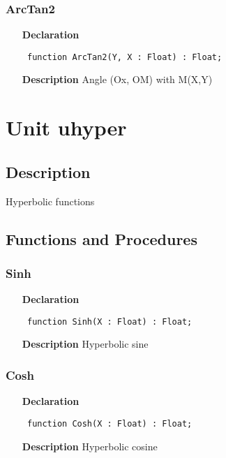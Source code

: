 \documentclass[12pt,a4paper,oneside]{report}
\newcommand{\declarationitem}[1]{\textbf{#1}}
\newcommand{\descriptiontitle}[1]{\textbf{#1}}
\newcommand{\code}[1]{\texttt{#1}}
\begin{document}
\subsubsection{ArcTan2}
\label{utrigo-ArcTan2}
\begin{itemize}\item[\declarationitem{Declaration}\hfill]
	\begin{flushleft}
		\code{
			function ArcTan2(Y, X : Float) : Float;}
		
	\end{flushleft}
	
	\par
	\item[\descriptiontitle{Description}]
	Angle (Ox, OM) with M(X,Y)
	
\end{itemize}

\section{Unit uhyper}
\label{uhyper}
\subsection{Description}
Hyperbolic functions 
\subsection{Functions and Procedures}
\subsubsection{Sinh}
\label{uhyper-Sinh}
\begin{itemize}\item[\declarationitem{Declaration}\hfill]
	\begin{flushleft}
		\code{
			function Sinh(X : Float) : Float;}
		
	\end{flushleft}
	
	\par
	\item[\descriptiontitle{Description}]
	Hyperbolic sine
	
\end{itemize}
\subsubsection{Cosh}
\label{uhyper-Cosh}
\begin{itemize}\item[\declarationitem{Declaration}\hfill]
	\begin{flushleft}
		\code{
			function Cosh(X : Float) : Float;}
		
	\end{flushleft}
	
	\par
	\item[\descriptiontitle{Description}]
	Hyperbolic cosine
	
\end{itemize}
\end{document}
